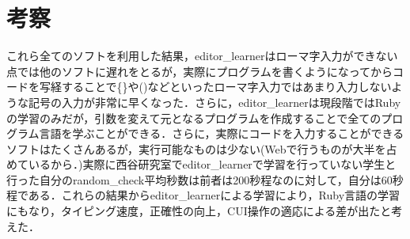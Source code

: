 \section{考察}\label{ux8003ux5bdf}

これら全てのソフトを利用した結果，editor\_learnerはローマ字入力ができない点では他のソフトに遅れをとるが，実際にプログラムを書くようになってからコードを写経することで\{\}や()などといったローマ字入力ではあまり入力しないような記号の入力が非常に早くなった．さらに，editor\_learnerは現段階ではRubyの学習のみだが，引数を変えて元となるプログラムを作成することで全てのプログラム言語を学ぶことができる．さらに，実際にコードを入力することができるソフトはたくさんあるが，実行可能なものは少ない(Webで行うものが大半を占めているから．)実際に西谷研究室でeditor\_learnerで学習を行っていない学生と行った自分のrandom\_check平均秒数は前者は200秒程なのに対して，自分は60秒程である．これらの結果からeditor\_learnerによる学習により，Ruby言語の学習にもなり，タイピング速度，正確性の向上，CUI操作の適応による差が出たと考えた．

    